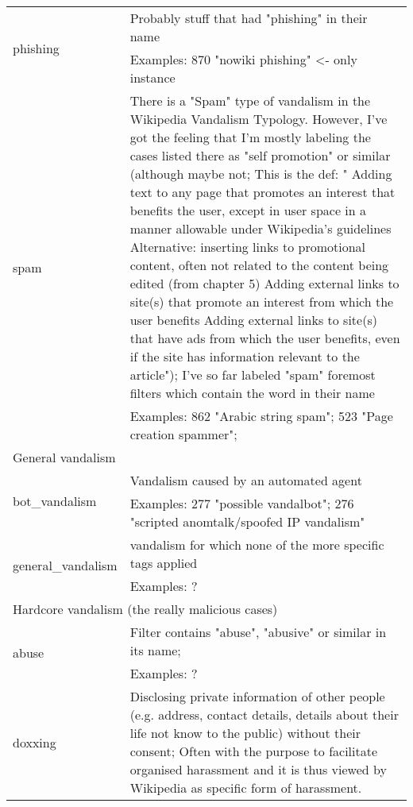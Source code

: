 \begin{longtable}{ | p{5cm} | p{9cm} | }
    \hline
    \multirow{2}{*}{phishing} & Probably stuff that had "phishing" in their name\\
                                     & Examples: 870 "nowiki phishing" <- only instance\\
    \hline
    \multirow{2}{*}{spam} & There is a "Spam" type of vandalism in the Wikipedia Vandalism Typology. However, I've got the feeling that I'm mostly labeling the cases listed there as "self promotion" or similar (although maybe not; This is the def: "    Adding text to any page that promotes an interest that benefits the user, except in user space in a manner allowable under Wikipedia's guidelines
  Alternative: inserting links to promotional content, often not related to the content being edited (from chapter 5)
    Adding external links to site(s) that promote an interest from which the user benefits
    Adding external links to site(s) that have ads from which the user benefits, even if the site has information relevant to the article");
  I've so far labeled "spam" foremost filters which contain the word in their name\\
                                     & Examples: 862 "Arabic string spam";  523 "Page creation spammer";\\
    \hline \hline
        \multicolumn{2}{|l|}{General vandalism} \\
    \hline
    \multirow{2}{*}{bot\_vandalism} & Vandalism caused by an automated agent\\
                                     & Examples: 277 "possible vandalbot"; 276 "scripted anomtalk/spoofed IP vandalism"\\
    \hline
    \multirow{2}{*}{general\_vandalism} & vandalism for which none of the more specific tags applied\\
                                     & Examples: ?\\
    \hline \hline
        \multicolumn{2}{|l|}{Hardcore vandalism (the really malicious cases)} \\
    \hline
    \multirow{2}{*}{abuse} & Filter contains "abuse", "abusive" or similar in its name; \\%
                                     & Examples: ?\\
    \hline
    \multirow{2}{*}{doxxing} & Disclosing private information of other people (e.g. address, contact details, details about their life not know to the public) without their consent; Often with the purpose to facilitate organised harassment and it is thus viewed by Wikipedia as specific form of harassment.

\end{longtable}
